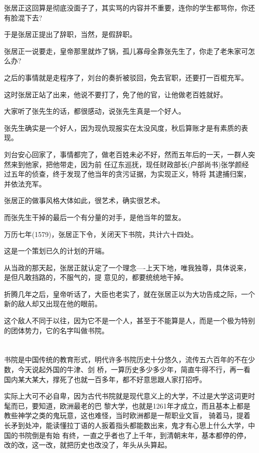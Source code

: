 \documentclass[11pt,a4paper,onecolumn]{article}
\begin{document}
张居正这回算是彻底没面子了，其实骂的内容并不重要，连你的学生都骂你，你还有脸混下去?

于是张居正提出了辞职，当然，是假辞职。

张居正一说要走，皇帝那里就炸了锅，孤儿寡母全靠张先生了，你走了老朱家可怎么办?

之后的事情就是走程序了，刘台的奏折被驳回，免去官职，还要打一百棍充军。

这时张居正站了出来，他说不要打了，免了他的官，让他做老百姓就好。

大家听了张先生的话，都很感动，说张先生真是一个好人。

张先生确实是一个好人，因为现仇现报实在太没风度，秋后算账才是有素质的表现。

刘台安心回家了，事情都完了，做老百姓未必不好，然而五年后的一天，一群人突然来到他家，把他带走，因为前
任辽东巡抚，现任财政部长(户部尚书)张学颜经过五年的侦查，终于发现了他当年的贪污证据，为实现正义，特将
其逮捕归案，并依法充军。

张居正的做事风格大体如此，很艺术，确实很艺术。

而张先生干掉的最后一个有分量的对手，是他当年的盟友。

万历七年(1579)，张居正下令，关闭天下书院，共计六十四处。

这是一个策划已久的计划的开端。

从当政的那天起，张居正就认定了一个理念----上天下地，唯我独尊，具体说来，是但凡敢挡路的，不服气的，提
意见的，都要统统地干掉。

折腾几年之后，皇帝听话了，大臣也老实了，就在张居正以为大功告成之际，一个新的敌人却又出现在他的眼前。

这个敌人不同于以往，因为它不是一个人，甚至于不能算是人，而是一个极为特别的团体势力，它的名字叫做书院。

\section[\thesection]{}

书院是中国传统的教育形式，明代许多书院历史十分悠久，流传五六百年的不在少数，今天说起外国的牛津、剑
桥，一算历史多少多少年，简直牛得不行，再一看国内某大某大，撑死了也就一百多年，都不好意思跟人家打招呼。

实际上大可不必自卑，因为古代书院就是现代意义上的大学，不过是大学这词更时髦而已，要知道，欧洲最老的巴
黎大学，也就是1261年才成立，而且基本上都是教些神学之类的鬼玩意，这也难怪，当时欧洲都是一帮职业文盲，
骑着马，提着长矛到处冲，能读懂拉丁语的人扳着指头都能数出来，鬼才有心思上什么大学，中国的书院倒是有始
有终，一直之乎者也了上千年，到清朝末年，基本都停的停，改的改，这一改，就把历史也改没了，年头从头算起。
\end{document}
